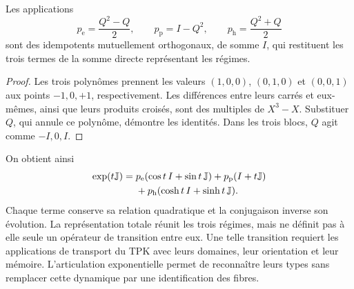 \begin{proposition}
\label{x_reciprocidad:euler-trit-proyectores}
Les applications
\[
 p_{\mathrm e}=\frac{Q^2-Q}{2},\qquad
 p_{\mathrm p}=I-Q^2,\qquad
 p_{\mathrm h}=\frac{Q^2+Q}{2}
\]
sont des idempotents mutuellement orthogonaux, de somme \(I\), qui restituent les trois
termes de la somme directe représentant les régimes.
\end{proposition}
\begin{proof}
Les trois polynômes prennent les valeurs \((1,0,0)\), \((0,1,0)\) et
\((0,0,1)\) aux points \(-1,0,+1\), respectivement. Les différences
entre leurs carrés et eux-mêmes, ainsi que leurs produits croisés, sont
des multiples de \(X^3-X\). Substituer \(Q\), qui annule ce polynôme, démontre
les identités. Dans les trois blocs, \(Q\) agit comme \(-I,0,I\).
\end{proof}

On obtient ainsi
\begin{align}
 \exp(t\mathbb J)
 ={}&p_{\mathrm e}(\cos t\,I+\sin t\,\mathbb J)
   +p_{\mathrm p}(I+t\mathbb J)\notag\\
   &+p_{\mathrm h}(\cosh t\,I+\sinh t\,\mathbb J).
 \label{x_reciprocidad:euler-trit-exponencial-total}
\end{align}
Chaque terme conserve sa relation quadratique et la conjugaison inverse
son évolution. La représentation totale réunit les trois régimes, mais ne
définit pas à elle seule un opérateur de transition entre eux. Une telle transition
requiert les applications de transport du TPK avec leurs domaines, leur orientation et
leur mémoire. L’articulation exponentielle permet de reconnaître leurs types sans
remplacer cette dynamique par une identification des fibres.



